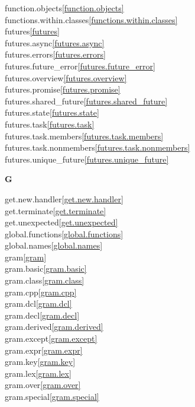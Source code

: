 \begin{multicols}{2}
function.objects\quad\ref{function.objects}\\
functions.within.classes\quad\ref{functions.within.classes}\\
futures\quad\ref{futures}\\
futures.async\quad\ref{futures.async}\\
futures.errors\quad\ref{futures.errors}\\
futures.future_error\quad\ref{futures.future_error}\\
futures.overview\quad\ref{futures.overview}\\
futures.promise\quad\ref{futures.promise}\\
futures.shared_future\quad\ref{futures.shared_future}\\
futures.state\quad\ref{futures.state}\\
futures.task\quad\ref{futures.task}\\
futures.task.members\quad\ref{futures.task.members}\\
futures.task.nonmembers\quad\ref{futures.task.nonmembers}\\
futures.unique_future\quad\ref{futures.unique_future}\\
\par \textbf{G}\par
get.new.handler\quad\ref{get.new.handler}\\
get.terminate\quad\ref{get.terminate}\\
get.unexpected\quad\ref{get.unexpected}\\
global.functions\quad\ref{global.functions}\\
global.names\quad\ref{global.names}\\
gram\quad\ref{gram}\\
gram.basic\quad\ref{gram.basic}\\
gram.class\quad\ref{gram.class}\\
gram.cpp\quad\ref{gram.cpp}\\
gram.dcl\quad\ref{gram.dcl}\\
gram.decl\quad\ref{gram.decl}\\
gram.derived\quad\ref{gram.derived}\\
gram.except\quad\ref{gram.except}\\
gram.expr\quad\ref{gram.expr}\\
gram.key\quad\ref{gram.key}\\
gram.lex\quad\ref{gram.lex}\\
gram.over\quad\ref{gram.over}\\
gram.special\quad\ref{gram.special}\\

\end{multicols}
